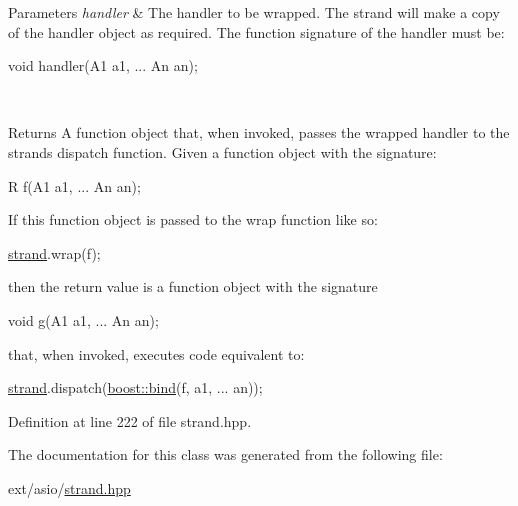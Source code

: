 \begin{DoxyParams}{Parameters}
{\em handler} & The handler to be wrapped. The strand will make a copy of the handler object as required. The function signature of the handler must be\+:
\begin{DoxyCode}
\textcolor{keywordtype}{void} handler(A1 a1, ... An an); 
\end{DoxyCode}
\\
\hline
\end{DoxyParams}
\begin{DoxyReturn}{Returns}
A function object that, when invoked, passes the wrapped handler to the strand\textquotesingle{}s dispatch function. Given a function object with the signature\+: 
\begin{DoxyCode}
R f(A1 a1, ... An an); 
\end{DoxyCode}
 If this function object is passed to the wrap function like so\+: 
\begin{DoxyCode}
\hyperlink{classasio_1_1io__service_1_1strand_a8f06eed4e6699a26bfcfdbd2feb1b7ff}{strand}.wrap(f); 
\end{DoxyCode}
 then the return value is a function object with the signature 
\begin{DoxyCode}
\textcolor{keywordtype}{void} g(A1 a1, ... An an); 
\end{DoxyCode}
 that, when invoked, executes code equivalent to\+: 
\begin{DoxyCode}
\hyperlink{classasio_1_1io__service_1_1strand_a8f06eed4e6699a26bfcfdbd2feb1b7ff}{strand}.dispatch(\hyperlink{namespaceasio_1_1detail_1_1socket__ops_a86014a1273549d66157c6e4dd9532f86}{boost::bind}(f, a1, ... an)); 
\end{DoxyCode}
 
\end{DoxyReturn}


Definition at line 222 of file strand.\+hpp.



The documentation for this class was generated from the following file\+:\begin{DoxyCompactItemize}
\item 
ext/asio/\hyperlink{strand_8hpp}{strand.\+hpp}\end{DoxyCompactItemize}
